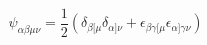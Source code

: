 \begin{equation}
\psi_{\alpha\beta\mu\nu} =\frac{1}{2} (\delta_{\beta [ \mu} \delta_{\alpha ] \nu} + \epsilon_{\beta\gamma [\mu} 
\epsilon_{\alpha ] \gamma\nu}) 
\end{equation}

